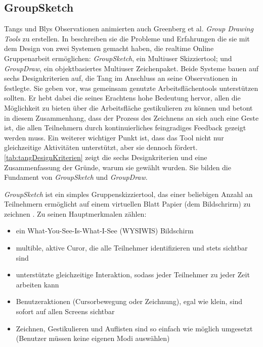 \subsection{GroupSketch} 
\bigskip Tangs und Blys Observationen animierten auch Greenberg et al. \emph{Group Drawing Tools} zu erstellen. In \citep{Greenberg:1992p83} beschreiben sie die Probleme und Erfahrungen die sie mit dem Design von zwei Systemen gemacht haben, die realtime Online Gruppenarbeit ermöglichen: \emph{GroupSketch}, ein Multiuser Skizziertool; und \emph{GroupDraw}, ein objektbasiertes Multiuser Zeichenpaket.
Beide Systeme bauen auf sechs Designkriterien auf, die Tang im Anschluss an seine Observationen in \citep{TangJC:1989} festlegte. Sie geben vor, was gemeinsam genutzte Arbeitsflächentools unterstützen sollten. Er hebt dabei die seines Erachtens hohe Bedeutung hervor, allen die Möglichkeit zu bieten über die Arbeitsfläche gestikulieren zu können und betont in diesem Zusammenhang, dass der Prozess des Zeichnens an sich auch eine Geste ist, die allen Teilnehmern durch kontinuierliches feingradiges Feedback gezeigt werden muss. Ein weiterer wichtiger Punkt ist, dass das Tool nicht nur gleichzeitige Aktivitäten unterstützt, aber sie dennoch fördert. \autoref{tab:tangDesignKriterien} zeigt die sechs Designkriterien und eine Zusammenfassung der Gründe, warum sie gewählt wurden. Sie bilden die Fundament von \emph{GroupSketch} und \emph{GroupDraw}.

\medskip \emph{GroupSketch} ist ein simples Gruppenskizziertool, das einer beliebigen Anzahl an Teilnehmern ermöglicht auf einem virtuellen Blatt Papier (dem Bildschrirm) zu zeichnen \citep{Greenberg:1991}. Zu seinen Hauptmerkmalen zählen:
\begin{itemize}
	\item{ein What-You-See-Is-What-I-See (WYSIWIS) Bildschirm}
	\item{multible, aktive Curor, die alle Teilnehmer identifizieren und stets sichtbar sind}
	\item{unterstützte gleichzeitige Interaktion, sodass jeder Teilnehmer zu jeder Zeit arbeiten kann}
	\item{Benutzeraktionen (Cursorbewegung oder Zeichnung), egal wie klein, sind sofort auf allen Screens sichtbar}
	\item{Zeichnen, Gestikulieren und Auflisten sind so einfach wie möglich umgesetzt (Benutzer müssen keine eigenen Modi auswählen)}
\end{itemize}

